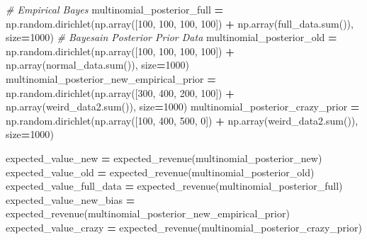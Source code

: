 \documentclass[
]{book}
\newenvironment{Shaded}{\begin{snugshade}}{\end{snugshade}}
\newcommand{\BuiltInTok}[1]{#1}
\newcommand{\CommentTok}[1]{\textcolor[rgb]{0.56,0.35,0.01}{\textit{#1}}}
\newcommand{\DecValTok}[1]{\textcolor[rgb]{0.00,0.00,0.81}{#1}}
\newcommand{\NormalTok}[1]{#1}
\newcommand{\OperatorTok}[1]{\textcolor[rgb]{0.81,0.36,0.00}{\textbf{#1}}}
\theoremstyle{definition}
\theoremstyle{definition}
\theoremstyle{definition}
\theoremstyle{remark}
\begin{document}
\begin{Shaded}
\begin{Highlighting}[]
\CommentTok{\# Empirical Bayes}
\NormalTok{multinomial\_posterior\_full }\OperatorTok{=}\NormalTok{ np.random.dirichlet(np.array([}\DecValTok{100}\NormalTok{, }\DecValTok{100}\NormalTok{, }\DecValTok{100}\NormalTok{, }\DecValTok{100}\NormalTok{]) }\OperatorTok{+}\NormalTok{ np.array(full\_data.}\BuiltInTok{sum}\NormalTok{()), size}\OperatorTok{=}\DecValTok{1000}\NormalTok{)}
\CommentTok{\# Bayesain Posterior Prior Data}
\NormalTok{multinomial\_posterior\_old }\OperatorTok{=}\NormalTok{ np.random.dirichlet(np.array([}\DecValTok{100}\NormalTok{, }\DecValTok{100}\NormalTok{, }\DecValTok{100}\NormalTok{, }\DecValTok{100}\NormalTok{]) }\OperatorTok{+}\NormalTok{ np.array(normal\_data.}\BuiltInTok{sum}\NormalTok{()), size}\OperatorTok{=}\DecValTok{1000}\NormalTok{)}
\NormalTok{multinomial\_posterior\_new\_empirical\_prior }\OperatorTok{=}\NormalTok{ np.random.dirichlet(np.array([}\DecValTok{300}\NormalTok{, }\DecValTok{400}\NormalTok{, }\DecValTok{200}\NormalTok{, }\DecValTok{100}\NormalTok{]) }\OperatorTok{+}\NormalTok{ np.array(weird\_data2.}\BuiltInTok{sum}\NormalTok{()), size}\OperatorTok{=}\DecValTok{1000}\NormalTok{)}
\NormalTok{multinomial\_posterior\_crazy\_prior }\OperatorTok{=}\NormalTok{ np.random.dirichlet(np.array([}\DecValTok{100}\NormalTok{, }\DecValTok{400}\NormalTok{, }\DecValTok{500}\NormalTok{, }\DecValTok{0}\NormalTok{]) }\OperatorTok{+}\NormalTok{ np.array(weird\_data2.}\BuiltInTok{sum}\NormalTok{()), size}\OperatorTok{=}\DecValTok{1000}\NormalTok{)}

\NormalTok{expected\_value\_new }\OperatorTok{=}\NormalTok{ expected\_revenue(multinomial\_posterior\_new)}
\NormalTok{expected\_value\_old }\OperatorTok{=}\NormalTok{ expected\_revenue(multinomial\_posterior\_old)}
\NormalTok{expected\_value\_full\_data }\OperatorTok{=}\NormalTok{ expected\_revenue(multinomial\_posterior\_full)}
\NormalTok{expected\_value\_new\_bias }\OperatorTok{=}\NormalTok{ expected\_revenue(multinomial\_posterior\_new\_empirical\_prior)}
\NormalTok{expected\_value\_crazy }\OperatorTok{=}\NormalTok{ expected\_revenue(multinomial\_posterior\_crazy\_prior)}


\end{Highlighting}
\end{Shaded}
\end{document}
